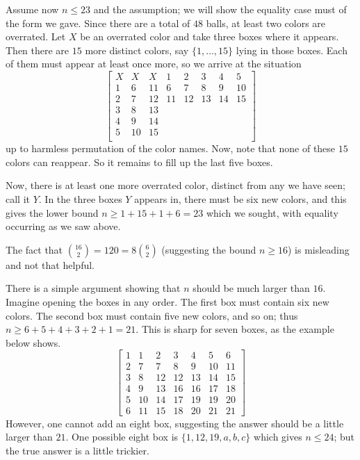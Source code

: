 \documentclass[11pt]{scrartcl}
\begin{document}
Assume now $n \le 23$ and the assumption;
we will show the equality case must of the form we gave.
Since there are a total of $48$ balls,
at least two colors are overrated.
Let $X$ be an overrated color and take three boxes where it appears.
Then there are $15$ more distinct colors, say $\{1, \dots, 15\}$
lying in those boxes.
Each of them must appear at least once more,
so we arrive at the situation
\[
  \begin{bmatrix}
    X & X & X & 1 & 2 & 3 & 4 & 5 \\
    1 & 6 & 11 & 6 & 7 & 8 & 9 & 10 \\
    2 & 7 & 12 & 11 & 12 & 13 & 14 & 15 \\
    3 & 8 & 13 \\
    4 & 9 & 14 \\
    5 & 10 & 15 \\
  \end{bmatrix}
\]
up to harmless permutation of the color names.
Now, note that none of these $15$ colors can reappear.
So it remains to fill up the last five boxes.

Now, there is at least one more overrated color,
distinct from any we have seen; call it $Y$.
In the three boxes $Y$ appears in,
there must be six new colors,
and this gives the lower bound $n \ge 1 + 15 + 1 + 6 = 23$
which we sought,
with equality occurring as we saw above.

\begin{remark*}
  The fact that $\binom{16}{2} = 120 = 8 \binom{6}{2}$
  (suggesting the bound $n \ge 16$) is misleading
  and not that helpful.

  There is a simple argument showing that $n$
  should be much larger than $16$.
  Imagine opening the boxes in any order.
  The first box must contain six new colors.
  The second box must contain five new colors,
  and so on; thus $n \ge 6 + 5 + 4 + 3 + 2 + 1 = 21$.
  This is sharp for seven boxes, as the example below shows.
  \[
    \begin{bmatrix}
      1 & 1 & 2 & 3 & 4 & 5 & 6 \\
      2 & 7 & 7 & 8 & 9 & 10 & 11 \\
      3 & 8 & 12 & 12 & 13 & 14 & 15 \\
      4 & 9 & 13 & 16 & 16 & 17 & 18 \\
      5 & 10 & 14 & 17 & 19 & 19 & 20 \\
      6 & 11 & 15 & 18 & 20 & 21 & 21
    \end{bmatrix}
  \]
  However, one cannot add an eight box,
  suggesting the answer should be a little larger than $21$.
  One possible eight box is $\{1,12,19,a,b,c\}$
  which gives $n \le 24$; but the true answer is a little trickier.
\end{remark*}
\end{document}
